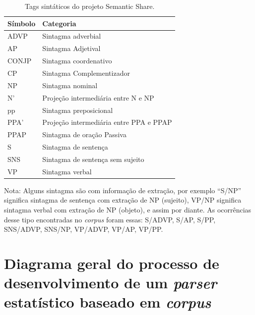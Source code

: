 \begin{table}[H]

   \centering
   \small
   \caption{ Tags sintáticos do projeto Semantic Share.}

    \begin{tabular}{ | p{3cm} | p{10cm} | }
      \hline
        \textbf{Símbolo} & \textbf{Categoria}\\
        \hline
        \hline

        ADVP& Sintagma adverbial \\
        \hline
        AP& Sintagma Adjetival\\
        \hline
        CONJP&Sintagma coordenativo\\
        \hline
        CP&Sintagma Complementizador\\
        \hline
        NP&Sintagma nominal\\
        \hline
        N'&Projeção intermediária entre N e NP\\
        \hline
        pp&Sintagma preposicional\\
        \hline
        PPA'&Projeção intermediária entre PPA e PPAP\\
        \hline
        PPAP&Sintagma de oração Passiva\\
        \hline
        S&Sintagma de sentença\\
        \hline
        SNS&Sintagma de sentença sem sujeito\\
        \hline
        VP&Sintagma verbal\\
        \hline

   \end{tabular}
   \label{tbl:semantic_share_cats}

\end{table}

Nota: Alguns sintagma são com informação de extração, por exemplo ``S/NP'' significa sintagma de sentença com extração de NP (sujeito), VP/NP significa sintagma verbal com extração de NP (objeto), e assim por diante. As ocorrências desse tipo encontradas no \emph{corpus} foram essas: S/ADVP, S/AP, S/PP, SNS/ADVP, SNS/NP, VP/ADVP, VP/AP, VP/PP.

\newpage

\section{Diagrama geral do processo de desenvolvimento de um \emph{parser} estatístico baseado em \emph{corpus}} %
\label{sec:diagrama_geral_do_processo_de_parsing_estatistico_baseado_em_corpus}

